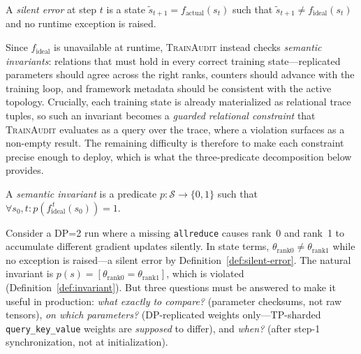 \documentclass[sigconf,nonacm]{acmart}
\begin{document}
\begin{definition}
\label{def:silent-error}
A \emph{silent error} at step $t$ is a state $\tilde{s}_{t+1} = f_{\text{actual}}(s_t)$ such that $\tilde{s}_{t+1} \neq f_{\text{ideal}}(s_t)$ and no runtime exception is raised.
\end{definition}

Since $f_{\text{ideal}}$ is unavailable at runtime, \textsc{TrainAudit} instead checks \emph{semantic invariants}: relations that must hold in every correct training state---replicated parameters should agree across the right ranks, counters should advance with the training loop, and framework metadata should be consistent with the active topology. Crucially, each training state is already materialized as relational trace tuples, so such an invariant becomes a \emph{guarded relational constraint} that \textsc{TrainAudit} evaluates as a query over the trace, where a violation surfaces as a non-empty result. The remaining difficulty is therefore to make each constraint precise enough to deploy, which is what the three-predicate decomposition below provides.

\begin{definition}
\label{def:invariant}
A \emph{semantic invariant} is a predicate $p: \mathcal{S} \to \{0, 1\}$ such that $\forall s_0, t: p(f_{\text{ideal}}^{\,t}(s_0)) = 1$.
\end{definition}

Consider a DP=2 run where a missing \texttt{allreduce} causes rank~0 and rank~1 to accumulate different gradient updates silently. In state terms, $\theta_{\text{rank0}} \neq \theta_{\text{rank1}}$ while no exception is raised---a silent error by Definition~\ref{def:silent-error}. The natural invariant is $p(s) = [\theta_{\text{rank0}} = \theta_{\text{rank1}}]$, which is violated (Definition~\ref{def:invariant}). But three questions must be answered to make it useful in production: \emph{what exactly to compare?} (parameter checksums, not raw tensors), \emph{on which parameters?} (DP-replicated weights only---TP-sharded \texttt{query\_key\_value} weights are \emph{supposed} to differ), and \emph{when?} (after step-1 synchronization, not at initialization).
\end{document}
